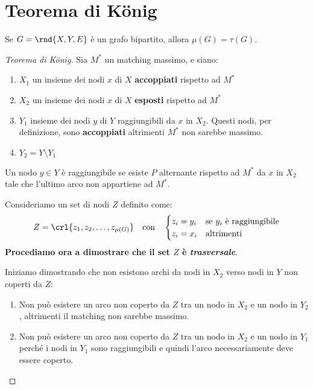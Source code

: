 \documentclass[\main/main.tex]{subfiles}
\begin{document}
\section{Teorema di König}

\begin{theorem}
	Se \(G=\rnd{X, Y, E}\) è un grafo bipartito, allora \(\mu(G) = \tau(G)\).
\end{theorem}

\begin{proof}[Teorema di König]
	Sia \(M^*\) un matching massimo, e siano:
	\begin{enumerate}
		\item \(X_1\) un insieme dei nodi \(x\) di \(X\) \textbf{accoppiati} rispetto ad \(M^*\)
		\item \(X_2\) un insieme dei nodi \(x\) di \(X\) \textbf{esposti} rispetto ad \(M^*\)
		\item \(Y_1\) insieme dei nodi \(y\) di \(Y\) raggiungibili da \(x\) in \(X_2\). Questi nodi, per definizione, sono \textbf{accoppiati} altrimenti \(M^*\) non sarebbe massimo.
		\item \(Y_2 = Y \setminus Y_1\)
	\end{enumerate}

	\begin{center}
		\begin{minipage}{0.618\textwidth}
			\begin{definition}
				Un nodo \(y \in Y\) è raggiungibile se esiste \(P\) alternante rispetto ad \(M^*\) da \(x\) in \(X_2\) tale che l'ultimo arco non appartiene ad \(M^*\).
			\end{definition}
		\end{minipage}
	\end{center}

	Consideriamo un set di nodi \(Z\) definito come:
	\[
		Z = \crl{z_1, z_2, \ldots, z_{\mu(G)}} \quad \text{con} \quad \begin{cases}
			z_i = y_i & \text{se \(y_i\) è raggiungibile} \\
			z_i = x_i & \text{altrimenti}
		\end{cases}
	\]
	\textbf{Procediamo ora a dimostrare che il set \(Z\) è \textit{trasversale}}.

	Iniziamo dimostrando che non esistono archi da nodi in \(X_2\) verso nodi in \(Y\) non coperti da \(Z\):

	\begin{enumerate}
		\item Non può esistere un arco non coperto da \(Z\) tra un nodo in \(X_2\) e un nodo in \(Y_2\), altrimenti il matching non sarebbe massimo.
		\item Non può esistere un arco non coperto da \(Z\) tra un nodo in \(X_2\) e un nodo in \(Y_1\) perché i nodi in \(Y_1\) sono raggiungibili e quindi l'arco necessariamente deve essere coperto.
	\end{enumerate}


\end{proof}
\end{document}
